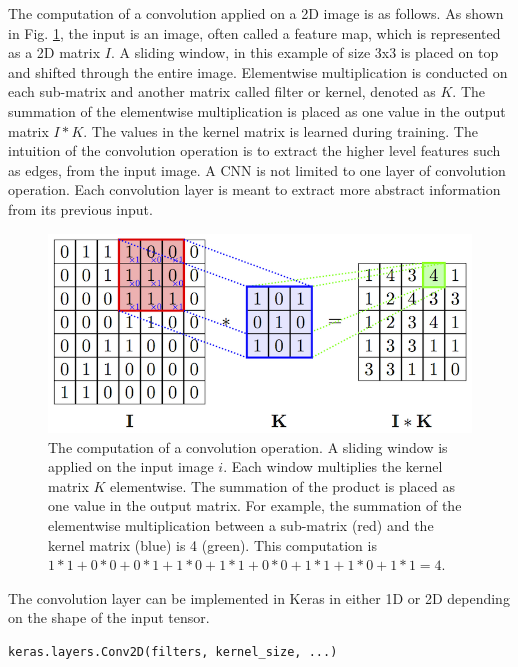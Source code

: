 The computation of a convolution applied on a 2D image is as follows. As shown in Fig. \ref{fig_Conv2d}, the input is an image, often called a feature map, which is represented as a 2D matrix $I$. A sliding window, in this example of size 3x3 is placed on top and shifted through the entire image. Elementwise multiplication is conducted on each sub-matrix and another matrix called filter or kernel, denoted as $K$. The summation of the elementwise multiplication is placed as one value in the output matrix $I*K$. The values in the kernel matrix is learned during training. The intuition of the convolution operation is to extract the higher level features such as edges, from the input image. A CNN is not limited to one layer of convolution operation. Each convolution layer is meant to extract more abstract information from its previous input.
\begin{figure}[h!]
\begin{center}
\includegraphics[width = 13cm]{img/convolution_computation.png}
\caption[The computation of a convolution operation]{The computation of a convolution operation. A sliding window is applied on the input image $i$. Each window multiplies the kernel matrix $K$ elementwise. The summation of the product is placed as one value in the output matrix. For example, the summation of the elementwise multiplication between a sub-matrix (red) and the kernel matrix (blue) is 4 (green). This computation is $1*1+0*0+0*1+1*0+1*1+0*0+1*1+1*0+1*1 = 4$.   \label{fig_Conv2d}}
\end{center}
\end{figure}

The convolution layer can be implemented in Keras in either 1D or 2D depending on the shape of the input tensor.
\begin{lstlisting}[language=python,frame=single]
keras.layers.Conv2D(filters, kernel_size, ...)
\end{lstlisting}

